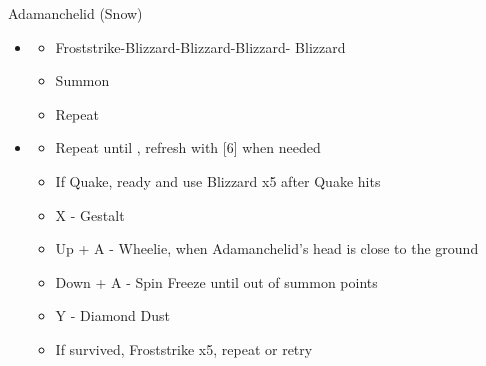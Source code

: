 \begin{multicols}{2}
\begin{battle}{Adamanchelid (Snow)}
\begin{itemize}
    \item \sixth
    \begin{itemize}
        \item Froststrike-Blizzard-Blizzard-Blizzard- Blizzard
        \item Summon
        \item Repeat
    \end{itemize}
    \item \fifth
    \begin{itemize}
        \item Repeat until \stagger, refresh with [6] when needed
        \item If Quake, ready and use Blizzard x5 after Quake hits
        \item X - Gestalt
        \item Up + A - Wheelie, when Adamanchelid's head is close to the ground
        \item Down + A - Spin Freeze until out of summon points
        \item Y - Diamond Dust
        \item If survived, Froststrike x5, repeat or retry
    \end{itemize}
\end{itemize}
\end{battle}


\end{multicols}
